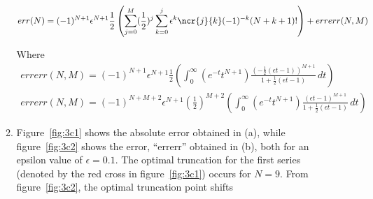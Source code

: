 \documentclass{/home/janmebows/Documents/LatexTemplates/myassignment}
\begin{document}
\begin{enumerate}
\begin{enumerate}
        \[err(N) = (-1)^{N+1}\epsilon^{N+1}\frac12 \left( \sum_{j=0}^{M}(\frac12)^j \sum_{k=0}^j \epsilon^k\ncr{j}{k}(-1)^{-k} (N+k+1)!\right) + errerr(N,M)\]

        Where
        \begin{align*}
            errerr(N,M) = (-1)^{N+1}\epsilon^{N+1}\frac12 \left(\int_0^\infty  \left(e^{-t}t^{N+1}\right)\frac{(-\frac12 (\epsilon t - 1))^{M+1}}{1 + \frac12 (\epsilon t - 1)}\, dt\right)\\
            errerr(N,M) = (-1)^{N+M+2}\epsilon^{N+1}\left(\frac12\right)^{M+2} \left(\int_0^\infty  \left(e^{-t}t^{N+1}\right)\frac{ (\epsilon t - 1)^{M+1}}{1 + \frac12 (\epsilon t - 1)}\, dt\right)  
        \end{align*}
        
        \item Figure~\ref{fig:3c1} shows the absolute error obtained in (a), while figure~\ref{fig:3c2} shows the error, ``errerr'' obtained in (b), both for an epsilon value of $\epsilon = 0.1$. The optimal truncation for the first series (denoted by the red cross in figure~\ref{fig:3c1}) occurs for $N=9$.
        From figure~\ref{fig:3c2}, the optimal truncation point shifts 



\end{enumerate}
\end{enumerate}
\end{document}
